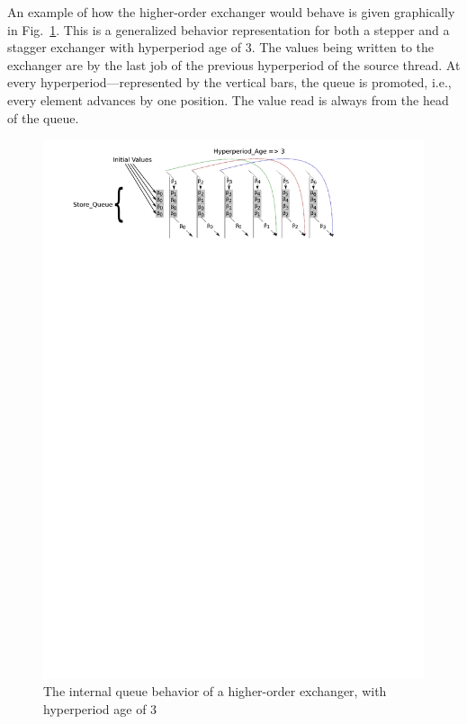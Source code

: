 An example of how the higher-order exchanger would behave is given
graphically in Fig.~\ref{fig:ho-exch}. This is a generalized behavior
representation for both a stepper and a stagger exchanger with
hyperperiod age of 3. The values being written to the exchanger are by
the last job of the previous hyperperiod of the source thread. At
every hyperperiod---represented by the vertical bars, the queue is
promoted, i.e., every element advances by one position. The value read
is always from the head of the queue.

\begin{figure}
\centering
\includegraphics{figs/ho-exch}
\caption{The internal queue behavior of a higher-order exchanger, with
  hyperperiod age of 3}
\label{fig:ho-exch}
\end{figure}

